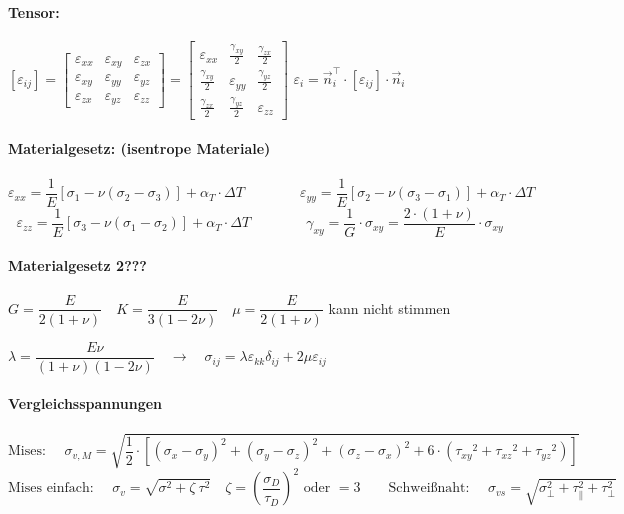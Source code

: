 \paragraph{ Tensor:}
	$ 
	\left[\varepsilon_{ij}\right]
	=
	\left[\begin{matrix}
		\varepsilon_{xx} & \varepsilon_{xy} & \varepsilon_{zx} \\
		\varepsilon_{xy} & \varepsilon_{yy} & \varepsilon_{yz} \\
		\varepsilon_{zx} & \varepsilon_{yz} & \varepsilon_{zz}
	\end{matrix}\right]
	=
	\left[\begin{matrix}
		\varepsilon_{xx}      & \frac{\gamma_{xy}}{2} & \frac{\gamma_{zx}}{2} \\
		\frac{\gamma_{xy}}{2} & \varepsilon_{yy}      & \frac{\gamma_{yz}}{2} \\
		\frac{\gamma_{zx}}{2} & \frac{\gamma_{yz}}{2} & \varepsilon_{zz}
	\end{matrix}\right]
	$
	\hfil
	$ \varepsilon_i = \vec{n}_i^\top \cdot [\varepsilon_{ij}] \cdot \vec{n}_i $
	\hfil
	
\paragraph{ Materialgesetz: (isentrope Materiale)}
	\[ 
		\varepsilon_{xx} = \dfrac{1}{E} \left[\sigma_1 - \nu (\sigma_2 - \sigma_3)\right] + \alpha_T \cdot \Delta T
		\qquad\qquad
		\varepsilon_{yy} = \dfrac{1}{E} \left[\sigma_2 - \nu (\sigma_3 - \sigma_1)\right] + \alpha_T \cdot \Delta T
	\]
	\[
		\varepsilon_{zz} = \dfrac{1}{E} \left[\sigma_3 - \nu (\sigma_1 - \sigma_2)\right] + \alpha_T \cdot \Delta T
		\qquad\qquad
		\gamma_{xy} = \dfrac{1}{G} \cdot \sigma_{xy} = \dfrac{2 \cdot (1 + \nu)}{E} \cdot \sigma_{xy}
	\]
	
\paragraph{ Materialgesetz 2???}
	$       G = \dfrac{E}{2(1+ \nu)} 
	\quad   K = \dfrac{E}{3(1-2\nu)} 
	\quad \mu = \dfrac{E}{2(1+ \nu)}   $ kann nicht stimmen
	
	$
		\lambda = \dfrac{E\nu}{ (1+\nu) (1-2\nu) } 
		\quad \rightarrow \quad
		\sigma_{ij} = \lambda\varepsilon_{kk} \delta_{ij} + 2\mu \varepsilon_{ij}
	$
	
	
\paragraph{ Vergleichsspannungen}
	\[ 
		\text{Mises: } \quad 
		\sigma_{v,M} = \sqrt{\dfrac{1}{2} \cdot \left[\left(\sigma_x-\sigma_y\right)^2+\left(\sigma_y-\sigma_z\right)^2+\left(\sigma_z-\sigma_x\right)^2+6\cdot\left({\tau_{xy}}^2+{\tau_{xz}}^2+{\tau_{yz}}^2\right)\right]}
	\]
	\[ 
	\text{Mises einfach: } \quad \sigma_v = \sqrt{\sigma^2 + \zeta\ \tau^2} \quad \zeta = \left(\dfrac{\sigma_D}{\tau_D}\right)^2 \text{ oder } = 3
	\qquad
	\text{Schweißnaht: }\quad \sigma_{vs} = \sqrt{\sigma_\perp^2 + \tau_\parallel^2 + \tau_\perp^2}
	\]

